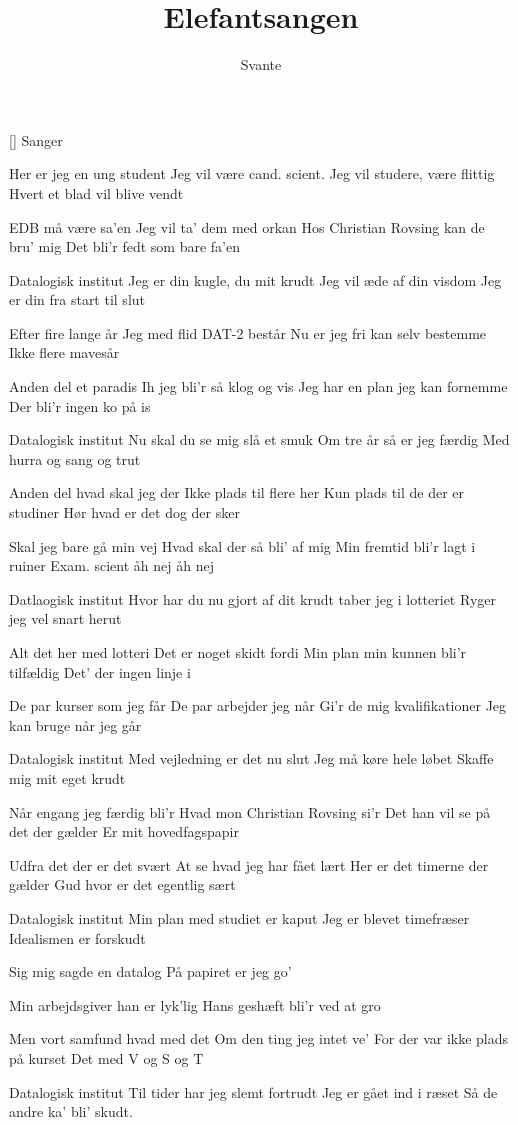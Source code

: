 \documentclass[a4paper,11pt]{article}
\title{Elefantsangen}
\author{Svante}
\begin{document}
\maketitle

\begin{roles}
  [] Sanger
\end{roles}

\begin{song}
  Her er jeg en ung student
  Jeg vil være cand. scient.
  Jeg vil studere, være flittig
  Hvert et blad vil blive vendt

  EDB må være sa'en
  Jeg vil ta' dem med orkan
  Hos Christian Rovsing kan de bru' mig
  Det bli'r fedt som bare fa'en

  Datalogisk institut
  Jeg er din kugle, du mit krudt
  Jeg vil æde af din visdom
  Jeg er din fra start til slut

  Efter fire lange år
  Jeg med flid DAT-2 består
  Nu er jeg fri kan selv bestemme
  Ikke flere mavesår

  Anden del et paradis
  Ih jeg bli'r så klog og vis
  Jeg har en plan jeg kan fornemme
  Der bli'r ingen ko på is

  Datalogisk institut
  Nu skal du se mig slå et smuk
  Om tre år så er jeg færdig
  Med hurra og sang og trut

  Anden del hvad skal jeg der
  Ikke plads til flere her
  Kun plads til de der er studiner
  Hør hvad er det dog der sker

  Skal jeg bare gå min vej
  Hvad skal der så bli' af mig
  Min fremtid bli'r lagt i ruiner
  Exam. scient åh nej åh nej

  Datlaogisk institut
  Hvor har du nu gjort af dit krudt
  taber jeg i lotteriet
  Ryger jeg vel snart herut

Alt det her med lotteri
Det er noget skidt fordi
Min plan min kunnen bli'r tilfældig
Det' der ingen linje i

De par kurser som jeg får
De par arbejder jeg når
Gi'r de mig kvalifikationer
Jeg kan bruge når jeg går

Datalogisk institut
Med vejledning er det nu slut
Jeg må køre hele løbet
Skaffe mig mit eget krudt

Når engang jeg færdig bli'r
Hvad mon Christian Rovsing si'r
Det han vil se på det der gælder
Er mit hovedfagspapir

Udfra det der er det svært
At se hvad jeg har fået lært
Her er det timerne der gælder
Gud hvor er det egentlig sært

Datalogisk institut
Min plan med studiet er kaput
Jeg er blevet timefræser
Idealismen er forskudt

Sig mig sagde en datalog
På papiret er jeg go'

Min arbejdsgiver han er lyk'lig
Hans geshæft bli'r ved at gro

Men vort samfund hvad med det
Om den ting jeg intet ve'
For der var ikke plads på kurset
Det med V og S og T

Datalogisk institut
Til tider har jeg slemt fortrudt
Jeg er gået ind i ræset
Så de andre ka' bli' skudt.
\end{song}
\end{document}
